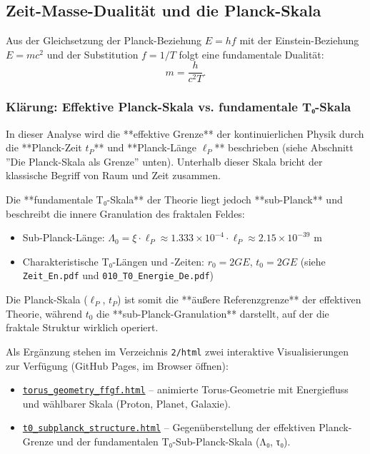 	\subsection{Zeit-Masse-Dualität und die Planck-Skala}
	Aus der Gleichsetzung der Planck-Beziehung \(E = hf\) mit der Einstein-Beziehung \(E = mc^2\) und der Substitution \(f = 1/T\) folgt eine fundamentale Dualität:
	\begin{equation}
		m = \frac{h}{c^2 T}.
		\label{eq:time_mass_duality}
	\end{equation}
	\subsubsection{Klärung: Effektive Planck-Skala vs. fundamentale T₀-Skala}
	In dieser Analyse wird die **effektive Grenze** der kontinuierlichen Physik durch die **Planck-Zeit \( t_P \)** und **Planck-Länge \(\ell_P\)** beschrieben (siehe Abschnitt ''Die Planck-Skala als Grenze'' unten). Unterhalb dieser Skala bricht der klassische Begriff von Raum und Zeit zusammen.
	
	Die **fundamentale T₀-Skala** der Theorie liegt jedoch **sub-Planck** und beschreibt die innere Granulation des fraktalen Feldes:
	\begin{itemize}
		\item Sub-Planck-Länge: \(\Lambda_0 = \xi \cdot \ell_P \approx 1.333 \times 10^{-4} \cdot \ell_P \approx 2.15 \times 10^{-39} \) m
		\item Charakteristische T₀-Längen und -Zeiten: \( r_0 = 2GE \), \( t_0 = 2GE \) (siehe \texttt{Zeit\_En.pdf} und \texttt{010\_T0\_Energie\_De.pdf})
	\end{itemize}
	
	Die Planck-Skala (\(\ell_P\), \( t_P \)) ist somit die **äußere Referenzgrenze** der effektiven Theorie, während \( t_0 \) die **sub-Planck-Granulation** darstellt, auf der die fraktale Struktur wirklich operiert.
	
	Als Ergänzung stehen im Verzeichnis \texttt{2/html} zwei interaktive Visualisierungen zur Verfügung (GitHub Pages, im Browser öffnen):
	\begin{itemize}
		\item \href{https://jpascher.github.io/T0-Time-Mass-Duality/2/html/torus_geometry_ffgf.html}{\texttt{torus\_geometry\_ffgf.html}} – animierte Torus-Geometrie mit Energiefluss und wählbarer Skala (Proton, Planet, Galaxie).
		\item \href{https://jpascher.github.io/T0-Time-Mass-Duality/2/html/t0_subplanck_structure.html}{\texttt{t0\_subplanck\_structure.html}} – Gegenüberstellung der effektiven Planck-Grenze und der fundamentalen T₀-Sub-Planck-Skala (Λ₀, τ₀).
	\end{itemize}
	
